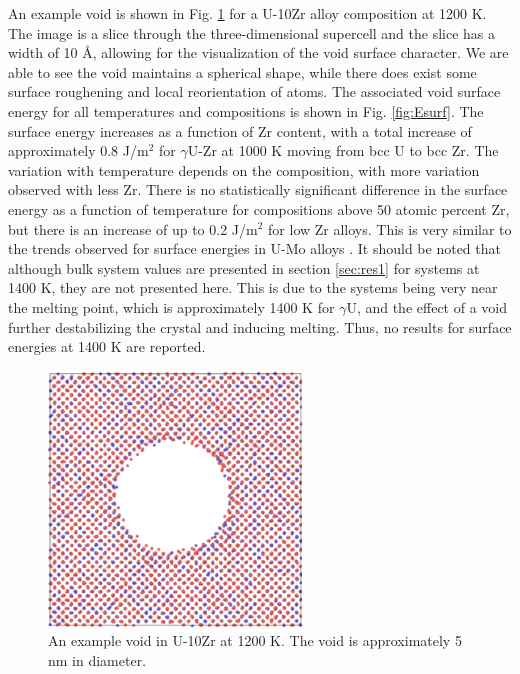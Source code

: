 \documentclass[review]{elsarticle}
\begin{document}
An example void is shown in Fig. \ref{fig:void} for a U-10Zr alloy composition at 1200 K. The image is a slice through the three-dimensional supercell and the slice has a width of 10 \AA, allowing for the visualization of the void surface character. We are able to see the void maintains a spherical shape, while there does exist some surface roughening and local reorientation of atoms. The associated void surface energy for all temperatures and compositions is shown in Fig. \ref{fig:Esurf}. The surface energy increases as a function of Zr content, with a total increase of approximately 0.8 J/m$^2$ for $\gamma$U-Zr at 1000 K moving from bcc U to bcc Zr. The variation with temperature depends on the composition, with more variation observed with less Zr. There is no statistically significant difference in the surface energy as a function of temperature for compositions above 50 atomic percent Zr, but there is an increase of up to 0.2 J/m$^2$ for low Zr alloys. This is very similar to the trends observed for surface energies in U-Mo alloys \cite{beelerumo}. It should be noted that although bulk system values are presented in section \ref{sec:res1} for systems at 1400 K, they are not presented here. This is due to the systems being very near the melting point, which is approximately 1400 K for $\gamma$U, and the effect of a void further destabilizing the crystal and inducing melting. Thus, no results for surface energies at 1400 K are reported. 

\begin{figure}[!htp]
\begin{center}
\includegraphics[width=0.6\textwidth]{void}
\end{center}
\caption{An example void in U-10Zr at 1200 K. The void is approximately 5 nm in diameter. }
\label{fig:void}
\end{figure}
\end{document}
